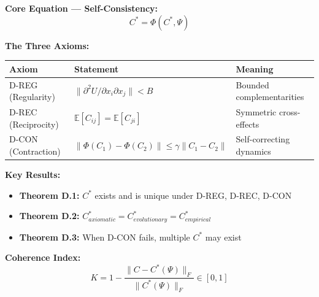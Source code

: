 \begin{tcolorbox}[colback=yellow!10!white, colframe=yellow!75!black,
    title=\textbf{Quick Reference}]

\textbf{Core Equation --- Self-Consistency:}
\begin{equation}
\boxed{C^* = \Phi(C^*, \Psi)}
\label{eq:D-core}
\end{equation}

\textbf{The Three Axioms:}
\begin{center}
\small
\begin{tabular}{@{}lll@{}}
\toprule
\textbf{Axiom} & \textbf{Statement} & \textbf{Meaning} \\
\midrule
D-REG (Regularity) & $\|\partial^2 U / \partial x_i \partial x_j\| < B$ & Bounded complementarities \\
D-REC (Reciprocity) & $\mathbb{E}[C_{ij}] = \mathbb{E}[C_{ji}]$ & Symmetric cross-effects \\
D-CON (Contraction) & $\|\Phi(C_1) - \Phi(C_2)\| \leq \gamma\|C_1 - C_2\|$ & Self-correcting dynamics \\
\bottomrule
\end{tabular}
\end{center}

\textbf{Key Results:}
\begin{itemize}[nosep]
    \item \textbf{Theorem D.1:} $C^*$ exists and is unique under D-REG, D-REC, D-CON
    \item \textbf{Theorem D.2:} $C^*_{axiomatic} = C^*_{evolutionary} = C^*_{empirical}$
    \item \textbf{Theorem D.3:} When D-CON fails, multiple $C^*$ may exist
\end{itemize}

\textbf{Coherence Index:}
\begin{equation}
K = 1 - \frac{\|C - C^*(\Psi)\|_F}{\|C^*(\Psi)\|_F} \in [0, 1]
\end{equation}

\end{tcolorbox}




